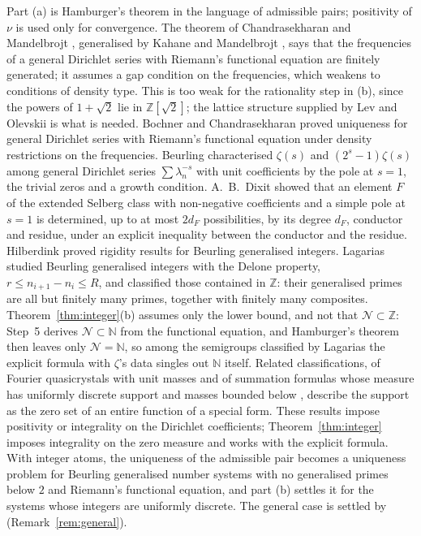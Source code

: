 \documentclass[11pt]{amsart}
\newcommand{\ZZ}{\mathbb Z}
\newcommand{\NN}{\mathbb N}
\theoremstyle{definition}
\theoremstyle{remark}
\numberwithin{equation}{section}
\begin{document}
Part (a) is Hamburger's theorem in the language of admissible pairs; positivity of $\nu$ is used only for convergence. The
theorem of Chandrasekharan and Mandelbrojt \cite[Theorem~3]{CM57}, generalised by Kahane and Mandelbrojt
\cite[Theorem~7]{KM58}, says that the frequencies of a general Dirichlet series with Riemann's functional equation are
finitely generated; it assumes a gap condition on the frequencies, which \cite{KM58} weakens to conditions of density type. This is too weak for the rationality step in (b), since the powers of $1+\sqrt2$ lie in $\ZZ[\sqrt2]$; the
lattice structure supplied by Lev and Olevskii is what is needed. Bochner and Chandrasekharan \cite{BC56} proved uniqueness
for general Dirichlet series with Riemann's functional equation under density restrictions on the frequencies. Beurling
\cite{Beu51} characterised $\zeta(s)$ and $(2^s-1)\zeta(s)$ among general Dirichlet series $\sum\lambda_n^{-s}$ with unit
coefficients by the pole at $s=1$, the trivial zeros and a growth condition. A.~B.~Dixit \cite{DixA20} showed that an element
$F$ of the extended Selberg class with non-negative coefficients and a simple pole at $s=1$ is determined, up to at most $2d_F$
possibilities, by its degree $d_F$, conductor and residue, under an explicit inequality between the conductor and the residue.
Hilberdink \cite{Hil12} proved rigidity results for Beurling generalised integers. Lagarias \cite{Lag99} studied Beurling
generalised integers with the Delone property, $r\le n_{i+1}-n_i\le R$, and classified those contained in $\ZZ$: their generalised
primes are all but finitely many primes, together with finitely many composites. Theorem~\ref{thm:integer}(b) assumes only the
lower bound, and not that $\mathcal N\subset\ZZ$: Step~5 derives $\mathcal N\subset\NN$ from the functional equation, and Hamburger's
theorem then leaves only $\mathcal N=\NN$, so among the semigroups classified by Lagarias the explicit formula with $\zeta$'s data
singles out $\NN$ itself. Related classifications, of Fourier quasicrystals with unit masses \cite{OU20} and of summation formulas
whose measure has uniformly discrete support and masses bounded below \cite[Theorem~5]{Gon23}, describe the support as the zero set
of an entire function of a special form. These results impose positivity or
integrality on the Dirichlet coefficients; Theorem~\ref{thm:integer} imposes integrality on the zero measure and works with the
explicit formula. With integer atoms, the uniqueness of the admissible pair becomes a uniqueness problem for Beurling
generalised number systems \cite{Beu37,DZ16} with no generalised primes below $2$ and Riemann's functional equation, and part
(b) settles it for the systems whose integers are uniformly discrete. The general case is settled by \cite[Theorem~3.11]{PaperI}
(Remark~\ref{rem:general}).
\end{document}
